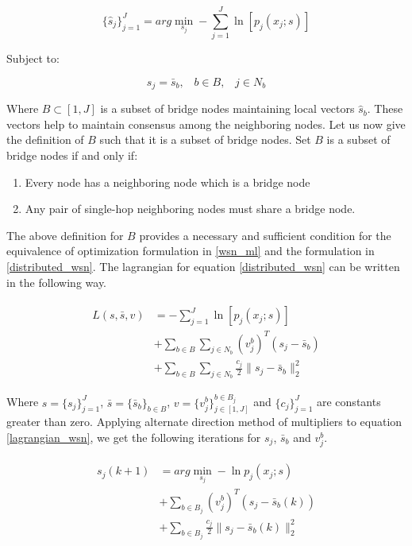 \documentclass[letterpaper, 10 pt, conference]{ieeeconf}  %
\begin{document}
\begin{equation} \label{distributed_wsn}
\{\hat{s}_j\}_{j=1}^{J} = arg \min_{s_j} - \sum_{j=1}^{J} \ln [p_j(x_j;s)]
\end{equation}

Subject to:

\begin{equation}
s_j = \bar{s}_b, \;\;\; b \in B, \;\;\; j \in N_b
\end{equation}

Where $B \subset [1,J]$ is a subset of bridge nodes maintaining local vectors $\hat{s}_b$. These vectors help to maintain consensus among the neighboring nodes. Let us now give the definition of $B$ such that it is a subset of bridge nodes.
Set $B$ is a subset of bridge nodes if and only if:
\begin{enumerate}
\label{bridge conditions}
\item Every node has a neighboring node which is a bridge node
\item Any pair of single-hop neighboring nodes must share a bridge node.
\end{enumerate}
The above definition for $B$ provides a necessary and sufficient condition for the equivalence of optimization formulation in \ref{wsn_ml} and the formulation in \ref{distributed_wsn}. The lagrangian for equation \ref{distributed_wsn} can be written in the following way.

\begin{align} \label{lagrangian_wsn}
\begin{split}
L(s,\bar{s},v) 
& = - \sum_{j=1}^{J} \ln [p_j(x_j;s)] \\
& + \sum_{b \in B} \sum_{j \in N_b} (v_j^b)^T(s_j - \bar{s}_b) \\
& + \sum_{b \in B} \sum_{j \in N_b} \frac{c_j}{2}\|s_j - \bar{s}_b\|_{2}^{2}
\end{split}
\end{align}

Where $s = \{s_j\}_{j=1}^{J}$, $\bar{s} = \{\bar{s}_b\}_{b \in B}$, $v = \{v_j^b\}_{j \in [1,J]}^{b \in B_j}$ and $\{c_j\}_{j=1}^{J}$ are constants greater than zero. Applying alternate direction method of multipliers to equation \ref{lagrangian_wsn}, we get the following iterations for $s_j$, $\bar{s}_b$ and $v_j^b$.

\begin{align}
\begin{split}
s_j(k+1) 
& = arg \min_{s_j} -\ln p_j(x_j;s) \\
& + \sum_{b \in B_j} (v_j^b)^T(s_j - \bar{s}_b(k)) \\
& + \sum_{b \in B_j} \frac{c_j}{2} \|s_j - \bar{s}_b(k)\|_{2}^{2}
\end{split}
\end{align}
\end{document}
